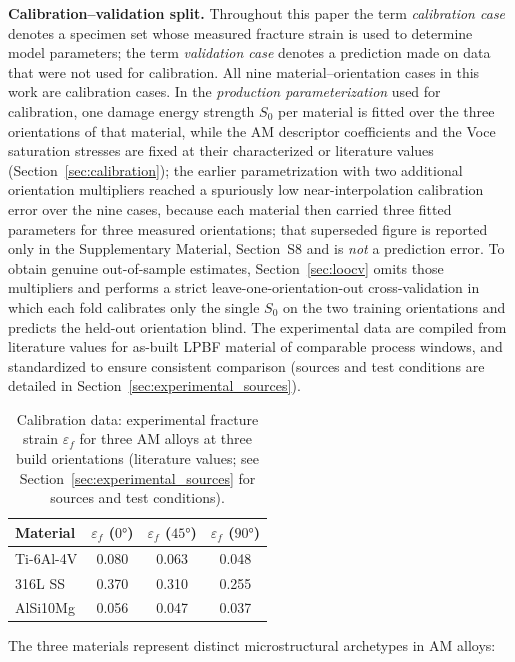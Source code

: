 \documentclass[twocolumn]{sagej}
\begin{document}
\textbf{Calibration--validation split.} Throughout this paper the term \emph{calibration case} denotes a specimen set whose measured fracture strain is used to determine model parameters; the term \emph{validation case} denotes a prediction made on data that were not used for calibration. All nine material--orientation cases in this work are calibration cases. In the \emph{production parameterization} used for calibration, one damage energy strength $S_0$ per material is fitted over the three orientations of that material, while the AM descriptor coefficients and the Voce saturation stresses are fixed at their characterized or literature values (Section~\ref{sec:calibration}); the earlier parametrization with two additional orientation multipliers reached a spuriously low near-interpolation calibration error over the nine cases, because each material then carried three fitted parameters for three measured orientations; that superseded figure is reported only in the Supplementary Material, Section~S8 and is \emph{not} a prediction error. To obtain genuine out-of-sample estimates, Section~\ref{sec:loocv} omits those multipliers and performs a strict leave-one-orientation-out cross-validation in which each fold calibrates only the single $S_0$ on the two training orientations and predicts the held-out orientation blind. The experimental data are compiled from literature values for as-built LPBF material of comparable process windows, and standardized to ensure consistent comparison (sources and test conditions are detailed in Section~\ref{sec:experimental_sources}).

\begin{table}[htbp]
\centering
\caption{Calibration data: experimental fracture strain $\varepsilon_f$ for three AM alloys at three build orientations (literature values; see Section~\ref{sec:experimental_sources} for sources and test conditions).}
\label{tab:experimental}
\footnotesize
\begin{tabular}{lccc}
\toprule
\textbf{Material} & $\varepsilon_f$ ($\ang{0}$) & $\varepsilon_f$ ($\ang{45}$) & $\varepsilon_f$ ($\ang{90}$) \\
\midrule
Ti-6Al-4V & 0.080 & 0.063 & 0.048 \\
316L SS   & 0.370 & 0.310 & 0.255 \\
AlSi10Mg  & 0.056 & 0.047 & 0.037 \\
\bottomrule
\end{tabular}
\end{table}

The three materials represent distinct microstructural archetypes in AM alloys:
\end{document}
